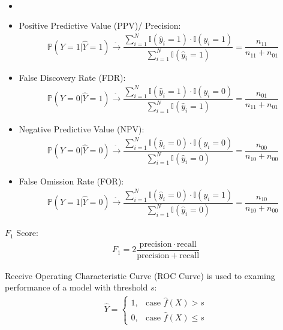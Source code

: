 \begin{itemize}[topsep=2pt,itemsep=0pt]
\begin{align}
    \end{align}
    \item 
    \item Positive Predictive Value (PPV)/ Precision:
    \begin{align}
        \mathbb{P}\left( Y=1|\hat{Y}=1 \right)\xrightarrow[]{\hat{ }}\dfrac{\sum_{i=1}^N\mathbb{I}(\hat{y}_i=1)\cdot\mathbb{I}(y_i=1)}{\sum_{i=1}^N\mathbb{I}(\hat{y}_i=1)} =\dfrac{n_{11}}{n_{11}+n_{01}} 
    \end{align}
    \item False Discovery Rate (FDR):
    \begin{align}
        \mathbb{P}\left( Y=0|\hat{Y}=1 \right)\xrightarrow[]{\hat{ }}\dfrac{\sum_{i=1}^N\mathbb{I}(\hat{y}_i=1)\cdot\mathbb{I}(y_i=0)}{\sum_{i=1}^N\mathbb{I}(\hat{y}_i=1)} =\dfrac{n_{01}}{n_{11}+n_{01}} 
    \end{align}
    \item Negative Predictive Value (NPV):
    \begin{align}
        \mathbb{P}\left( Y=0|\hat{Y}=0 \right)\xrightarrow[]{\hat{ }}\dfrac{\sum_{i=1}^N\mathbb{I}(\hat{y}_i=0)\cdot\mathbb{I}(y_i=0)}{\sum_{i=1}^N\mathbb{I}(\hat{y}_i=0)} =\dfrac{n_{00}}{n_{10}+n_{00}} 
    \end{align}
    \item False Omission Rate (FOR):
    \begin{align}
        \mathbb{P}\left( Y=1|\hat{Y}=0 \right)\xrightarrow[]{\hat{ }}\dfrac{\sum_{i=1}^N\mathbb{I}(\hat{y}_i=0)\cdot\mathbb{I}(y_i=1)}{\sum_{i=1}^N\mathbb{I}(\hat{y}_i=0)} =\dfrac{n_{10}}{n_{10}+n_{00}} 
    \end{align}
\end{itemize}

    $ F_1 $ Score:
    \begin{align}
        F_1=2\dfrac{\mathrm{precision}\cdot\mathrm{recall}  }{\mathrm{precision}+\mathrm{recall}  } 
    \end{align}
    
    Receive Operating Characteristic Curve (ROC Curve) is used to examing performance of a model with threshold $ s $:
    \begin{align}
        \hat{Y}=\begin{cases}
            1,&\text{case }\hat{f}(X)>s\\
            0,&\text{case }\hat{f}(X)\leq s
        \end{cases}
    \end{align}

